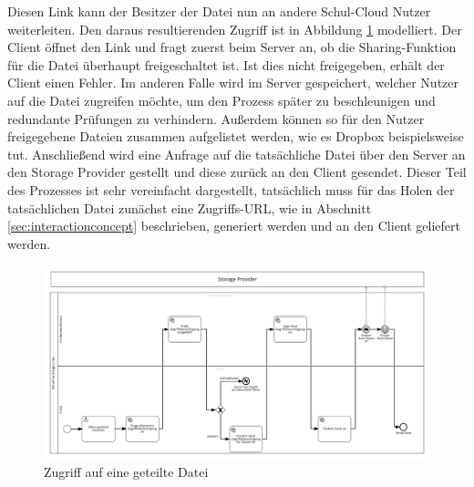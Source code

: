 Diesen Link kann der Besitzer der Datei nun an andere Schul-Cloud Nutzer weiterleiten. Den daraus resultierenden Zugriff ist in Abbildung \ref{fig:filesharingusing} modelliert. Der Client öffnet den Link und fragt zuerst beim Server an, ob die Sharing-Funktion für die Datei überhaupt freigeschaltet ist. Ist dies nicht freigegeben, erhält der Client einen Fehler. Im anderen Falle wird im Server gespeichert, welcher Nutzer auf die Datei zugreifen möchte, um den Prozess später zu beschleunigen und redundante Prüfungen zu verhindern. Außerdem können so für den Nutzer freigegebene Dateien zusammen aufgelistet werden, wie es Dropbox beispielsweise tut. Anschließend wird eine Anfrage auf die tatsächliche Datei über den Server an den Storage Provider gestellt und diese zurück an den Client gesendet. Dieser Teil des Prozesses ist sehr vereinfacht dargestellt, tatsächlich muss für das Holen der tatsächlichen Datei zunächst eine Zugriffs-URL, wie in Abschnitt \ref{sec:interactionconcept} beschrieben, generiert werden und an den Client geliefert werden.

\begin{figure}[H]
	\includegraphics[width=1\linewidth]{images/filesharingusing}
	\caption[Caption for concept]{Zugriff auf eine geteilte Datei}
	\centering
	\label{fig:filesharingusing}
\end{figure}


\clearpage
